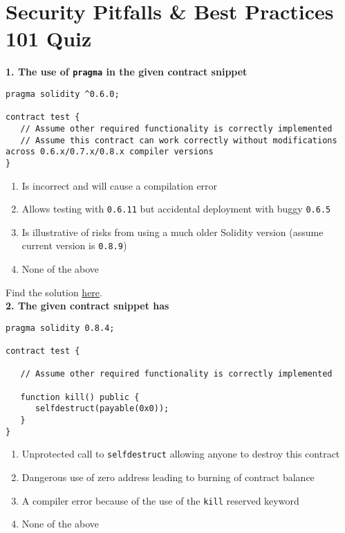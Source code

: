 \section{Security Pitfalls \& Best Practices 101 Quiz}

\textbf{1. The use of \texttt{pragma} in the given contract snippet}

\begin{lstlisting}[language=Solidity, style=solStyle]
pragma solidity ^0.6.0;

contract test {
   // Assume other required functionality is correctly implemented
   // Assume this contract can work correctly without modifications across 0.6.x/0.7.x/0.8.x compiler versions
}
\end{lstlisting}

\begin{enumerate}[label=\Alph*.]
    \item Is incorrect and will cause a compilation error
    \item Allows testing with \verb|0.6.11| but accidental deployment with buggy \verb|0.6.5|
    \item Is illustrative of risks from using a much older Solidity version (assume current version is \verb|0.8.9|)
    \item None of the above
\end{enumerate}

Find the solution \hyperref[sec:exam4_q1]{here}.\\

\textbf{2. The given contract snippet has}

\begin{lstlisting}[language=Solidity, style=solStyle]
pragma solidity 0.8.4;

contract test {

   // Assume other required functionality is correctly implemented

   function kill() public {
      selfdestruct(payable(0x0));
   }
}
\end{lstlisting}

\begin{enumerate}[label=\Alph*.]
    \item Unprotected call to \verb|selfdestruct| allowing anyone to destroy this contract
    \item Dangerous use of zero address leading to burning of contract balance
    \item A compiler error because of the use of the \verb|kill| reserved keyword
    \item None of the above
\end{enumerate}

